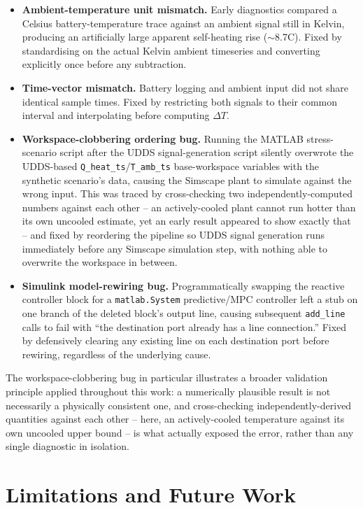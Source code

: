 \documentclass[10pt,conference]{IEEEtran}
\begin{document}
\begin{itemize}
\item \textbf{Ambient-temperature unit mismatch.} Early diagnostics compared a Celsius battery-temperature trace against an ambient signal still in Kelvin, producing an artificially large apparent self-heating rise ($\sim$8.7\textdegree C). Fixed by standardising on the actual Kelvin ambient timeseries and converting explicitly once before any subtraction.
\item \textbf{Time-vector mismatch.} Battery logging and ambient input did not share identical sample times. Fixed by restricting both signals to their common interval and interpolating before computing $\Delta T$.
\item \textbf{Workspace-clobbering ordering bug.} Running the MATLAB stress-scenario script after the UDDS signal-generation script silently overwrote the UDDS-based \texttt{Q\_heat\_ts}/\texttt{T\_amb\_ts} base-workspace variables with the synthetic scenario's data, causing the Simscape plant to simulate against the wrong input. This was traced by cross-checking two independently-computed numbers against each other -- an actively-cooled plant cannot run hotter than its own uncooled estimate, yet an early result appeared to show exactly that -- and fixed by reordering the pipeline so UDDS signal generation runs immediately before any Simscape simulation step, with nothing able to overwrite the workspace in between.
\item \textbf{Simulink model-rewiring bug.} Programmatically swapping the reactive controller block for a \texttt{matlab.System} predictive/MPC controller left a stub on one branch of the deleted block's output line, causing subsequent \texttt{add\_line} calls to fail with ``the destination port already has a line connection.'' Fixed by defensively clearing any existing line on each destination port before rewiring, regardless of the underlying cause.
\end{itemize}

The workspace-clobbering bug in particular illustrates a broader validation principle applied throughout this work: a numerically plausible result is not necessarily a physically consistent one, and cross-checking independently-derived quantities against each other -- here, an actively-cooled temperature against its own uncooled upper bound -- is what actually exposed the error, rather than any single diagnostic in isolation.

\section{Limitations and Future Work}
\label{sec:limitations}
\end{document}
